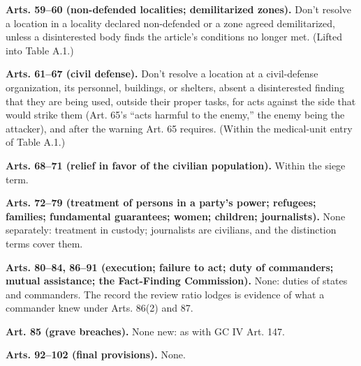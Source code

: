\textbf{Arts. 59–60 (non-defended localities; demilitarized zones).} Don't resolve a location in a locality declared non-defended or a zone agreed demilitarized, unless a disinterested body finds the article's conditions no longer met. (Lifted into Table A.1.)

\textbf{Arts. 61–67 (civil defense).} Don't resolve a location at a civil-defense organization, its personnel, buildings, or shelters, absent a disinterested finding that they are being used, outside their proper tasks, for acts against the side that would strike them (Art. 65's “acts harmful to the enemy,” the enemy being the attacker), and after the warning Art. 65 requires. (Within the medical-unit entry of Table A.1.)

\textbf{Arts. 68–71 (relief in favor of the civilian population).} Within the siege term.

\textbf{Arts. 72–79 (treatment of persons in a party's power; refugees; families; fundamental guarantees; women; children; journalists).} None separately: treatment in custody; journalists are civilians, and the distinction terms cover them.

\textbf{Arts. 80–84, 86–91 (execution; failure to act; duty of commanders; mutual assistance; the Fact-Finding Commission).} None: duties of states and commanders. The record the review ratio lodges is evidence of what a commander knew under Arts. 86(2) and 87.

\textbf{Art. 85 (grave breaches).} None new: as with GC IV Art. 147.

\textbf{Arts. 92–102 (final provisions).} None.
